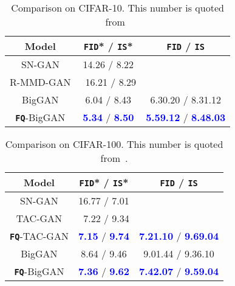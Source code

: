 \documentclass{article}
\begin{document}
\begin{table}[!t]
    \centering
    \begin{tabular}{@{}c|c|c@{}}
    \toprule
   Model &   \!\texttt{FID}*  / \!\texttt{IS}*   & \!\texttt{FID}  / \!\texttt{IS}       \\ \midrule
          SN-GAN    & 14.26 / 8.22 &     \\
          R-MMD-GAN  &  ~16.21 / 8.29  &    \\ \hline
          BigGAN    & 6.04 / 8.43  &    6.30{\scriptsize .20} / 8.31{\scriptsize .12}  \\
          \rowcolor{Gray} \textbf{\texttt{FQ}}-BigGAN  &  
          \textcolor{blue}{\textbf{5.34}} / \textcolor{blue}{\textbf{8.50}}   & 
          \textcolor{blue}{\textbf{5.59{\scriptsize.12}} }/ 
          \textcolor{blue}{\textbf{8.48{\scriptsize.03}} } \\
    \bottomrule
    \end{tabular}
     \vspace{-2mm}
    \caption{Comparison on CIFAR-10. This number is quoted from~\citep{wang2019improving}}
    \vspace{-2mm}
    \label{tab:score_cifar10}
\end{table}
\begin{table}[!t]
    \centering
    \begin{tabular}{c|c|c}
    \toprule
   Model &  \texttt{FID}*  / \texttt{IS}*   & \texttt{FID}  / \texttt{IS}      \\ \midrule
          SN-GAN    & 16.77 / 7.01 &    \\ \hline
          TAC-GAN      & ~7.22 / 9.34 &   \\
          \rowcolor{Gray} 
          \textbf{\texttt{FQ}}-TAC-GAN  &  \textcolor{blue}{\textbf{7.15}} / \textcolor{blue}{\textbf{9.74}} & 
          \textcolor{blue}{\textbf{7.21{\scriptsize .10}}} / \textcolor{blue}{\textbf{9.69{\scriptsize .04}}} \\ \hline
          BigGAN      & 8.64 / 9.46 & 9.01{\scriptsize .44} / 9.36{\scriptsize .10}  \\
          \rowcolor{Gray} 
          \textbf{\texttt{FQ}}-BigGAN  &  \textcolor{blue}{\textbf{7.36}} / \textcolor{blue}{\textbf{9.62}} & 
          \textcolor{blue}{\textbf{7.42{\scriptsize .07}}} / \textcolor{blue}{\textbf{9.59{\scriptsize .04}}} \\
    \bottomrule
    \end{tabular}
     \vspace{-2mm}
    \caption{Comparison on CIFAR-100. This number is quoted from~\citep{gong2019twin}.}
    \label{tab:score_cifar100}
     \vspace{-2mm}
\end{table}
\end{document}
